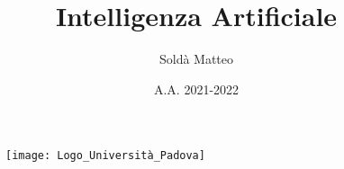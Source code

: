 \documentclass[12pt, a4paper]{article}
\title{Intelligenza Artificiale}
\author{Soldà Matteo }
\date{A.A. 2021-2022}
\begin{document}
\begin{figure}
    \centering
    \texttt{[image: Logo\_Università\_Padova]}
\end{figure}

\maketitle








\end{document}
